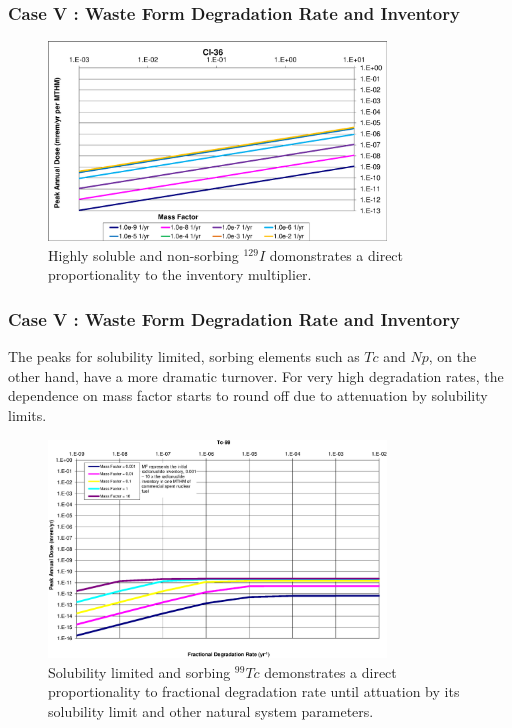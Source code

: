 \begin{frame}[c]
  \frametitle{Case V : Waste Form Degradation Rate and Inventory}
\begin{figure}[ht!]
\centering
\includegraphics[width=0.8\textwidth]{WFDegAndInv/Cl-36-MF.eps}
\caption{
Highly soluble and non-sorbing $^{129}I$ domonstrates a direct 
proportionality to the inventory multiplier.}
\label{fig:WFDegCl36MF}
\end{figure}
\end{frame}

\begin{frame}[c]
  \frametitle{Case V : Waste Form Degradation Rate and Inventory}
The peaks for solubility limited, sorbing elements such as $Tc$ and $Np$, on the 
other hand, have a more dramatic turnover.  For very high degradation rates, the 
dependence on mass factor starts to round off due to attenuation by solubility 
limits.


\begin{figure}[ht!]
\centering
\includegraphics[width=0.8\textwidth]{WFDegAndInv/Tc-99.eps}
\caption{
Solubility limited and sorbing $^{99}Tc$ demonstrates a direct proportionality 
to fractional degradation rate until attuation by its solubility limit and other 
natural system parameters. } 
\label{fig:WFDegTc99}
\end{figure}
\end{frame}


